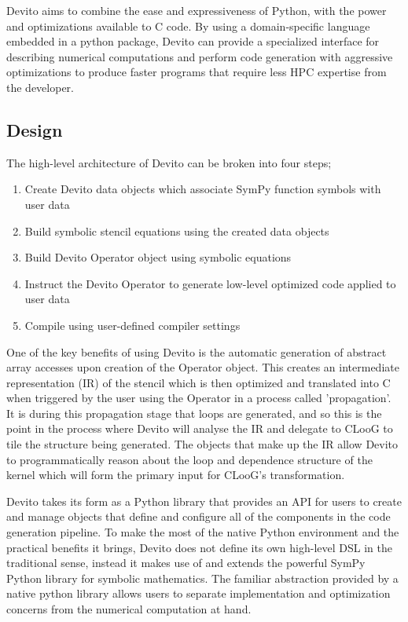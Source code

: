 \documentclass[a4paper,12pt,twoside]{report}
\begin{document}
Devito aims to combine the ease and expressiveness of Python, with the 
power and optimizations available to C code. By using a domain-specific language embedded in a python package, Devito can provide a specialized interface
for describing numerical computations and perform code generation with aggressive optimizations to produce faster programs that require less HPC expertise
from the developer.

\subsection*{Design}
The high-level architecture of Devito can be broken into four steps;
\begin{enumerate}
    \item Create Devito data objects which associate SymPy function symbols with user data
    \item Build symbolic stencil equations using the created data objects
    \item Build Devito Operator object using symbolic equations
    \item Instruct the Devito Operator to generate low-level optimized code applied to user data
    \item Compile using user-defined compiler settings
\end{enumerate}
One of the key benefits of using Devito is the automatic generation of abstract array accesses upon creation of the Operator object. This 
creates an intermediate representation (IR) of the stencil which is then optimized and translated into C when triggered by the user using the Operator
in a process called 'propagation'. It is during this propagation stage that loops are generated, and so this is the point in the process where
Devito will analyse the IR and delegate to CLooG to tile the structure being generated. The objects that make up the IR allow
Devito to programmatically reason about the loop and dependence structure of the kernel which will form the primary input for CLooG's transformation.

Devito takes its form as a Python library that provides an API for users to create and manage objects that define and configure all of the components
in the code generation pipeline. To make the most of the native Python environment and the practical benefits it brings, Devito does not define its 
own high-level DSL in the traditional sense, instead it makes use of and extends the powerful SymPy Python library for symbolic mathematics. 
The familiar abstraction provided by a native python library allows users to separate implementation and optimization concerns from the numerical computation at hand.
\end{document}
